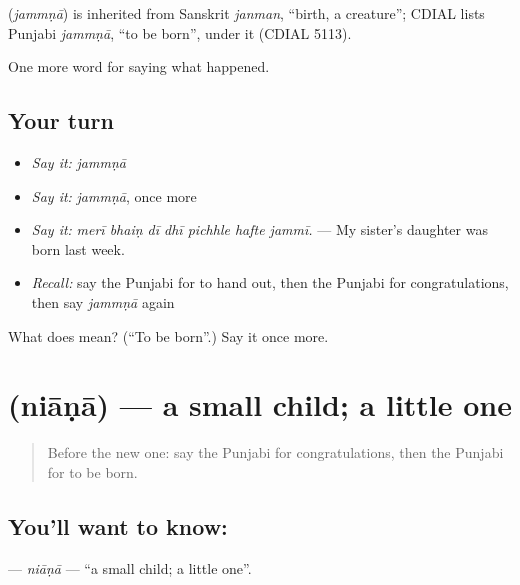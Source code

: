 \begin{cousinweb}
\textbf{} (\emph{jammṇā}) is inherited from Sanskrit \emph{janman}, \textquotedblleft{}birth, a creature\textquotedblright{}; CDIAL lists Punjabi \emph{jammṇā}, \textquotedblleft{}to be born\textquotedblright{}, under it (CDIAL 5113).
\end{cousinweb}

\begin{grammarlens}[title={What you've built}]
One more word for saying what happened.
\end{grammarlens}

\subsection*{Your turn}
\begin{itemize}
\raggedright
  \item \emph{Say it:} \emph{jammṇā}
  \item \emph{Say it:} \emph{jammṇā}, once more
  \item \emph{Say it:} \emph{merī bhaiṇ dī dhī pichhle hafte jammī.} — My sister's daughter was born last week.
  \item \emph{Recall:} say the Punjabi for to hand out, then the Punjabi for congratulations, then say \emph{jammṇā} again
\end{itemize}

\begin{tcolorbox}[breakable,colback=teal!4,colframe=teal!35!black,title={Before you move on}]
What does  mean? (\textquotedblleft{}To be born\textquotedblright{}.) Say it once more.
\end{tcolorbox}
\section[\texorpdfstring{\pa{ਨਿਆਣਾ} (niāṇā)}{ਨਿਆਣਾ (niāṇā)}]{ (niāṇā) — a small child; a little one}

\label{lesson:PA-C314-niana}



\begin{quote}
Before the new one: say the Punjabi for congratulations, then the Punjabi for to be born.
\end{quote}

\subsection*{You'll want to know: }
\textbf{} — \emph{niāṇā} — \textquotedblleft{}a small child; a little one\textquotedblright{}.

